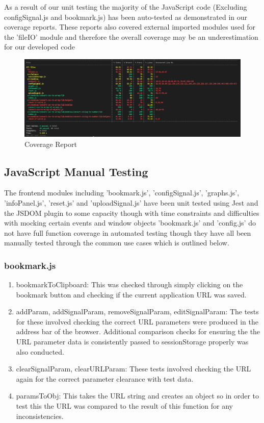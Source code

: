 As a result of our unit testing the majority of the JavaScript code (Excluding configSignal.js and bookmark.js) has been auto-tested as demonstrated in our coverage reports. These reports also covered external imported modules used for the 'fileIO' module and therefore the overall coverage may be an underestimation for our developed code

\begin{figure}[H]
    \centering
    \includegraphics[width=1.0\textwidth]{figures/coveragereports.png}
    \caption{\label{fig:Coverage Report}Coverage Report}
\end{figure}

\subsection{JavaScript Manual Testing}
The frontend modules including 'bookmark.js', 'configSignal.js', 'graphs.js', 'infoPanel.js', 'reset.js' and 'uploadSignal.js' have been unit tested using Jest and the JSDOM plugin to some capacity though with time constraints and difficulties with mocking certain events and window objects 'bookmark.js' and 'config.js' do not have full function coverage in automated testing though they have all been manually tested through the common use cases which is outlined below.

\subsubsection{bookmark.js}
\begin{enumerate}
\item bookmarkToClipboard: This was checked through simply clicking on the bookmark button and checking if the current application URL was saved.
\item addParam, addSignalParam, removeSignalParam, editSignalParam: The tests for these involved checking the correct URL parameters were produced in the address bar of the browser. Additional comparison checks for ensuring the the URL parameter data is consistently passed to sessionStorage properly was also conducted. 
\item clearSignalParam, clearURLParam: These tests involved checking the URL again for the correct parameter clearance with test data.
\item paramsToObj: This takes the URL string and creates an object so in order to test this the URL was compared to the result of this function for any inconsistencies. 
\end{enumerate}

